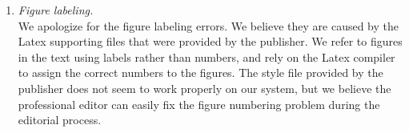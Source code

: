 \documentclass[12pt]{article}
\begin{document}
\begin{enumerate}
\item{\textit{Figure labeling.}\\
We apologize for the figure labeling errors. We believe they are caused by the Latex supporting files that were provided by the publisher. 
We refer to figures in the text using labels rather than numbers, and rely on the Latex compiler to assign the correct numbers to the figures.
The style file provided by the publisher does not seem to work properly on our system, but we believe the professional editor can easily fix the
figure numbering problem during the editorial process.}

\end{enumerate}
\end{document}
